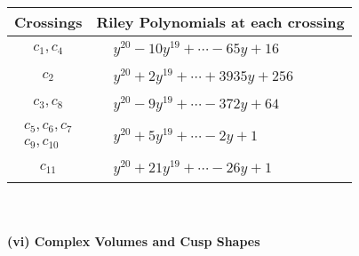 \documentclass[1p]{elsarticle_modified}
\theoremstyle{definition}
\begin{document}
\begin{tabular}{m{50pt}|m{274pt}}
Crossings & \hspace{64pt}Riley Polynomials at each crossing \\
\hline $$\begin{aligned}c_{1},c_{4}\end{aligned}$$&$\begin{aligned}
&y^{20}-10 y^{19}+\cdots-65 y+16
\end{aligned}$\\
\hline $$\begin{aligned}c_{2}\end{aligned}$$&$\begin{aligned}
&y^{20}+2 y^{19}+\cdots+3935 y+256
\end{aligned}$\\
\hline $$\begin{aligned}c_{3},c_{8}\end{aligned}$$&$\begin{aligned}
&y^{20}-9 y^{19}+\cdots-372 y+64
\end{aligned}$\\
\hline $$\begin{aligned}c_{5},c_{6},c_{7}\\c_{9},c_{10}\end{aligned}$$&$\begin{aligned}
&y^{20}+5 y^{19}+\cdots-2 y+1
\end{aligned}$\\
\hline $$\begin{aligned}c_{11}\end{aligned}$$&$\begin{aligned}
&y^{20}+21 y^{19}+\cdots-26 y+1
\end{aligned}$\\
\hline
\end{tabular}\\~\\
\newpage\flushleft \textbf{(vi) Complex Volumes and Cusp Shapes}
\end{document}

